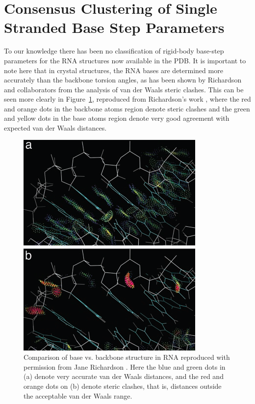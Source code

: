 \section{Consensus Clustering of Single Stranded Base Step Parameters}
To  our  knowledge there  has  been  no  classification of  rigid-body
base-step parameters for the RNA  structures now available in the PDB.
It is important to note here that in crystal structures, the RNA bases
are determined  more accurately than  the backbone torsion  angles, as
has been  shown by Richardson  and collaborators from the  analysis of
van  der Waals  steric  clashes.  This  can  be seen  more clearly  in
Figure~\ref{fig:murray},    reproduced    from    Richardson's    work
\cite{murray2003}, where the red and orange dots in the backbone atoms
region denote steric clashes and the green and yellow dots in the base
atoms region  denote very good  agreement with expected van  der Waals
distances.
\begin{figure}[htbp]
 \centering
 \includegraphics[scale=0.5]{Chapter2/murray2003.png}
 \caption{Comparison of base vs.  backbone structure in RNA reproduced
with permission from Jane  Richardson \cite{murray2003}. Here the blue
and green  dots in (a) denote  very accurate van  der Waals distances,
and the  red and orange  dots on (b)  denote steric clashes,  that is,
distances outside the acceptable van der Waals range.}
 \label{fig:murray}
\end{figure}

